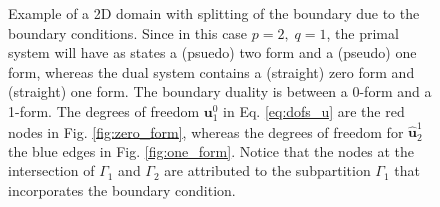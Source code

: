 \documentclass{elsarticle}
\newcommand*{\dual}[1]{\ensuremath{\widehat{#1}}}
\begin{document}
{\begin{figure}[tbh]
	\hspace{8pt}%
\caption{Example of a 2D domain with splitting of the boundary due to the boundary conditions. Since in this case $p=2, \; q=1$, the primal system will have as states a (psuedo) two form and a (pseudo) one form, whereas the dual system contains a (straight) zero form and (straight) one form. The boundary duality is between a 0-form  and a 1-form. The degrees of freedom $\mathbf{u}_1^{0}$ in Eq. \ref{eq:dofs_u} are the red nodes in Fig. \ref{fig:zero_form}, whereas the degrees of freedom for $\dual{\mathbf{u}}_2^{1}$ the blue edges in Fig. \ref{fig:one_form}.  Notice that the nodes at the intersection of $\Gamma_1$ and  $\Gamma_2$ are attributed to the subpartition $\Gamma_1$ that incorporates the boundary condition.}%
\label{fig:notation_dofs}%
\end{figure}

}
\end{document}
